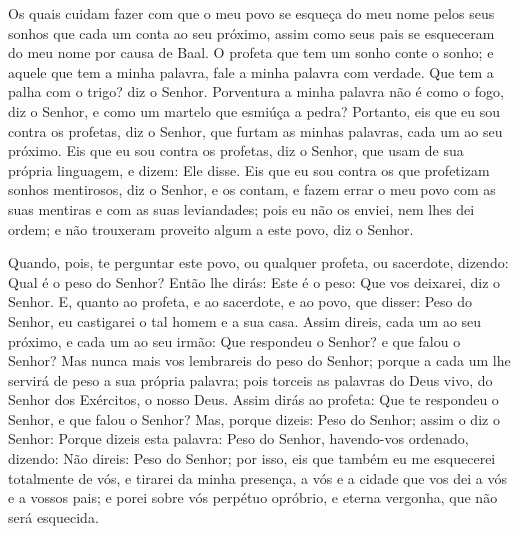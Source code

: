 Os quais cuidam fazer com que o meu povo se esqueça do meu
nome pelos seus sonhos que cada um conta ao seu próximo, assim como
seus pais se esqueceram do meu nome por causa de Baal. O
profeta que tem um sonho conte o sonho; e aquele que tem a minha
palavra, fale a minha palavra com verdade. Que tem a palha com o
trigo? diz o Senhor. Porventura a minha palavra não é como o
fogo, diz o Senhor, e como um martelo que esmiúça a pedra?
Portanto, eis que eu sou contra os profetas, diz o Senhor,
que furtam as minhas palavras, cada um ao seu próximo. Eis
que eu sou contra os profetas, diz o Senhor, que usam de sua própria
linguagem, e dizem: Ele disse. Eis que eu sou contra os que
profetizam sonhos mentirosos, diz o Senhor, e os contam, e fazem
errar o meu povo com as suas mentiras e com as suas leviandades;
pois eu não os enviei, nem lhes dei ordem; e não trouxeram proveito
algum a este povo, diz o Senhor.

Quando, pois, te perguntar este povo, ou qualquer profeta, ou
sacerdote, dizendo: Qual é o peso do Senhor? Então lhe dirás: Este é
o peso: Que vos deixarei, diz o Senhor. E, quanto ao profeta,
e ao sacerdote, e ao povo, que disser: Peso do Senhor, eu castigarei
o tal homem e a sua casa. Assim direis, cada um ao seu
próximo, e cada um ao seu irmão: Que respondeu o Senhor? e que falou
o Senhor? Mas nunca mais vos lembrareis do peso do Senhor;
porque a cada um lhe servirá de peso a sua própria palavra; pois
torceis as palavras do Deus vivo, do Senhor dos Exércitos, o nosso
Deus. Assim dirás ao profeta: Que te respondeu o Senhor, e
que falou o Senhor? Mas, porque dizeis: Peso do Senhor; assim
o diz o Senhor: Porque dizeis esta palavra: Peso do Senhor,
havendo-vos ordenado, dizendo: Não direis: Peso do Senhor;
por isso, eis que também eu me esquecerei totalmente de vós,
e tirarei da minha presença, a vós e a cidade que vos dei a vós e a
vossos pais; e porei sobre vós perpétuo opróbrio, e eterna
vergonha, que não será esquecida.

\medskip

